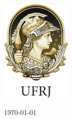 \documentclass[12pt]{article}
\begin{document}
\begin{titlepage}
\includegraphics[height=5cm]{logos/ufrj-logo.png}\\[1cm]
\vfill


{\large \today} %


\end{titlepage}

\tableofcontents \newpage
\listoffigures \newpage








%



\end{document}
